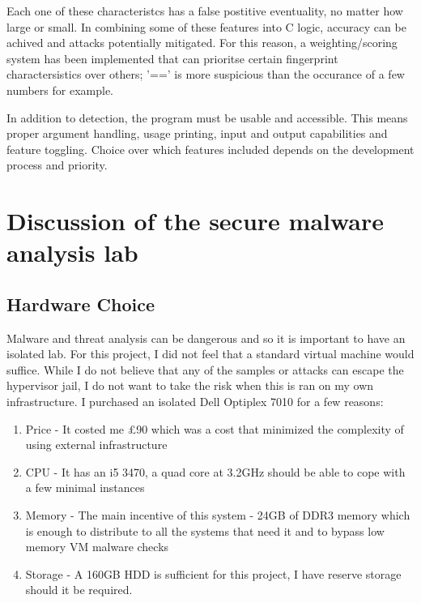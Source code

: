 Each one of these characteristcs has a false postitive eventuality, no matter how large or small. In combining some of these features into C logic, accuracy can be achived and attacks potentially mitigated. For this reason, a weighting/scoring system has been implemented that can prioritse certain fingerprint charactersistics over others; '==' is more suspicious than the occurance of a few numbers for example.

In addition to detection, the program must be usable and accessible. This means proper argument handling, usage printing, input and output capabilities and feature toggling. Choice over which features included depends on the development process and priority.



\chapter{Discussion of the secure malware analysis lab}
\section{Hardware Choice}
Malware and threat analysis can be dangerous and so it is important to have an isolated lab. For this project, I did not feel that a standard virtual machine would suffice. While I do not believe that any of the samples or attacks can escape the hypervisor jail, I do not want to take the risk when this is ran on my own infrastructure. 
I purchased an isolated Dell Optiplex 7010 for a few reasons: 
\begin{enumerate}
    \item Price - It costed me £90 which was a cost that minimized the complexity of using external infrastructure
    \item CPU - It has an i5 3470, a quad core at 3.2GHz should be able to cope with a few minimal instances
    \item Memory - The main incentive of this system - 24GB of DDR3 memory which is enough to distribute to all the systems that need it and to bypass low memory VM malware checks
    \item Storage - A 160GB HDD is sufficient for this project, I have reserve storage should it be required.
\end{enumerate}

